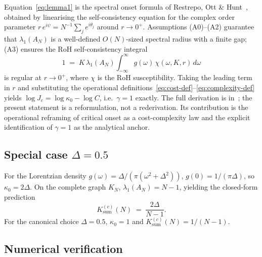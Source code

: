 \documentclass[11pt,a4paper,twocolumn]{article}
\begin{document}
Equation~\eqref{eq:lemma1} is the spectral onset formula of Restrepo, Ott \& Hunt~\cite{restrepo2005}, obtained by linearising the self-consistency equation for the complex order parameter $r\,e^{i\psi} = N^{-1}\sum_j e^{i\theta_j}$ around $r \to 0^+$. Assumptions (A0)--(A2) guarantee that $\lambda_1(A_N)$ is a well-defined $O(N)$-sized spectral radius with a finite gap; (A3) ensures the RoH self-consistency integral
\begin{equation}
1 \;=\; K\,\lambda_1(A_N) \int_{-\infty}^{\infty} g(\omega)\,\chi(\omega, K, r)\,d\omega
\end{equation}
is regular at $r \to 0^+$, where $\chi$ is the RoH susceptibility. Taking the leading term in $r$ and substituting the operational definitions~\eqref{eq:cost-def}--\eqref{eq:complexity-def} yields $\log J_c = \log \kappa_0 - \log C$, i.e.\ $\gamma = 1$ exactly. The full derivation is in~\cite{restrepo2005}; the present statement is a reformulation, not a rederivation. Its contribution is the operational reframing of critical onset as a cost-complexity law and the explicit identification of $\gamma = 1$ as the analytical anchor.

\subsection{Special case $\Delta = 0.5$}
\label{sec:lemma1-special}

For the Lorentzian density $g(\omega) = \Delta/(\pi(\omega^2 + \Delta^2))$, $g(0) = 1/(\pi\Delta)$, so $\kappa_0 = 2\Delta$. On the complete graph $K_N$, $\lambda_1(A_N) = N-1$, yielding the closed-form prediction
\begin{equation}
K_\mathrm{sum}^{(c)}(N) \;=\; \frac{2\Delta}{N-1}.
\label{eq:special-KN}
\end{equation}
For the canonical choice $\Delta = 0.5$, $\kappa_0 = 1$ and $K_\mathrm{sum}^{(c)}(N) = 1/(N-1)$.

\subsection{Numerical verification}
\label{sec:lemma1-numerical}
\end{document}

